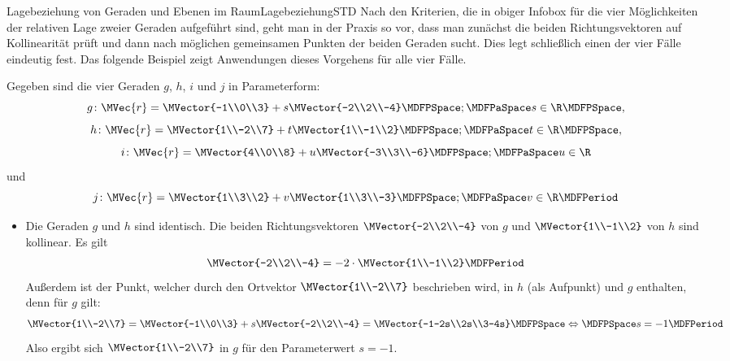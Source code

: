 \begin{MXContent}{Lagebeziehung von Geraden und Ebenen im Raum}{Lagebeziehung}{STD}
Nach den Kriterien, die in obiger Infobox für die vier Möglichkeiten der relativen Lage zweier Geraden aufgeführt sind, geht man in der Praxis so vor, dass man zunächst die beiden Richtungsvektoren auf Kollinearität prüft und dann nach möglichen gemeinsamen Punkten der beiden Geraden sucht. Dies legt schließlich einen der vier Fälle eindeutig fest. Das folgende Beispiel zeigt Anwendungen dieses Vorgehens für alle vier Fälle.

\begin{MExample}
Gegeben sind die vier Geraden $g$, $h$, $i$ und $j$ in Parameterform:
\[
 g\colon\MVec{r}=\MVector{-1\\0\\3}+s\MVector{-2\\2\\-4}\MDFPSpace;\MDFPaSpace s\in\R \MDFPSpace,
\]
\[
 h\colon\MVec{r}=\MVector{1\\-2\\7}+t\MVector{1\\-1\\2} \MDFPSpace;\MDFPaSpace t\in\R \MDFPSpace,
\]
\[
 i\colon\MVec{r}=\MVector{4\\0\\8}+u\MVector{-3\\3\\-6} \MDFPSpace;\MDFPaSpace u\in\R
\]
und
\[
 j\colon\MVec{r}=\MVector{1\\3\\2}+v\MVector{1\\3\\-3} \MDFPSpace;\MDFPaSpace v\in\R \MDFPeriod
\]
\begin{itemize}
\item Die Geraden $g$ und $h$ sind identisch. Die beiden Richtungsvektoren $\MVector{-2\\2\\-4}$ von $g$ und $\MVector{1\\-1\\2}$ von $h$ sind kollinear. Es gilt
\[
  \MVector{-2\\2\\-4}= -2\cdot\MVector{1\\-1\\2} \MDFPeriod
\]
Außerdem ist der Punkt, welcher durch den Ortvektor $\MVector{1\\-2\\7}$ beschrieben wird, in $h$ (als Aufpunkt) und $g$ enthalten, denn für $g$ gilt:
\[
 \MVector{1\\-2\\7}=\MVector{-1\\0\\3}+s\MVector{-2\\2\\-4}=\MVector{-1-2s\\2s\\3-4s}\MDFPSpace\Leftrightarrow\MDFPSpace s=-1\MDFPeriod
\]
Also ergibt sich $\MVector{1\\-2\\7}$ in $g$ für den Parameterwert $s=-1$.


\end{itemize}
\end{MExample}
\end{MXContent}
